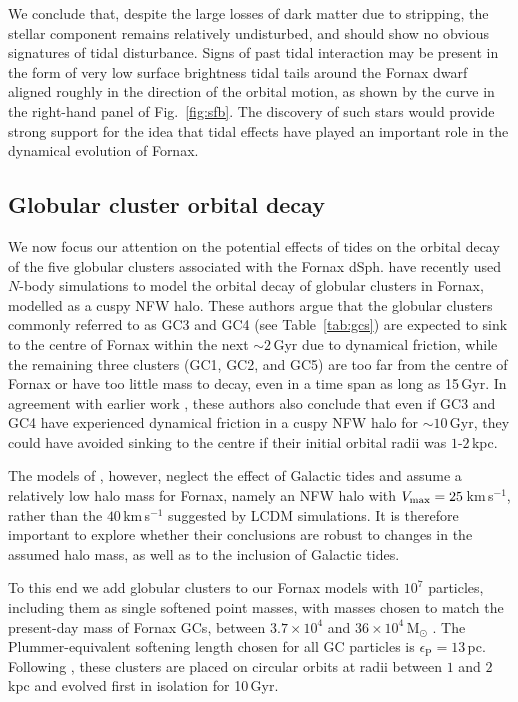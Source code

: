 \documentclass[fleqn,usenatbib]{mnras}
\begin{document}
We conclude that, despite the large losses of dark matter due to stripping, the stellar component remains relatively undisturbed, and should show no obvious signatures of tidal disturbance. Signs of past tidal interaction may be present in the form of very low surface brightness tidal tails around the Fornax dwarf aligned roughly in the direction of the orbital motion, as shown by the curve in the right-hand panel of Fig.~\ref{fig:sfb}. The discovery of such stars would provide strong support for the idea that tidal effects have played an important role in the dynamical evolution of Fornax.

\subsection{Globular cluster orbital decay}
\label{sec:GC}

We now focus our attention on the potential effects of tides on the orbital decay of the five globular clusters associated with the Fornax dSph. \citet{Meadows2020} have recently used $N$-body simulations to model the orbital decay of globular clusters in Fornax, modelled as a cuspy NFW halo. These authors argue that the globular clusters commonly referred to as GC3 and GC4 (see Table~\ref{tab:gcs}) are expected to sink to the centre of Fornax within the next $\sim 2$\,Gyr due to dynamical friction, while the remaining three clusters (GC1, GC2, and GC5) are too far from the centre of Fornax or have too little mass to decay, even in a time span as long as 15\,Gyr. In agreement with earlier work \citep[][]{Angus2009,Cole2012}, these authors also conclude that even if GC3 and GC4 have experienced dynamical friction in a cuspy NFW halo for $\sim 10$\,Gyr, they could have avoided sinking to the centre if their initial orbital radii was $1$-$2$\,kpc.

The models of \citet{Meadows2020}, however, neglect the effect of Galactic tides and assume a relatively low halo mass for Fornax, namely an NFW halo with $V_{\rm max}=25$\,km\,s$^{-1}$, rather than the $40$\,km\,s$^{-1}$ suggested by LCDM simulations. It is therefore important to explore whether their conclusions are robust to changes in the assumed halo mass, as well as to the inclusion of Galactic tides.

To this end we add globular clusters to our Fornax models with $10^7$ particles, including them as single softened point masses, with masses chosen to match the present-day mass of Fornax GCs, between $3.7\times10^4$ and $36\times10^4$\,M$_\odot$ \citep{Mackey2003}. The Plummer-equivalent softening length chosen for all GC particles is $\epsilon_\mathrm{P} = 13$\,pc. Following \citet{Meadows2020}, these clusters are placed on circular orbits at radii between $1$ and $2$\,kpc and evolved first in isolation for 10\,Gyr.
\end{document}
